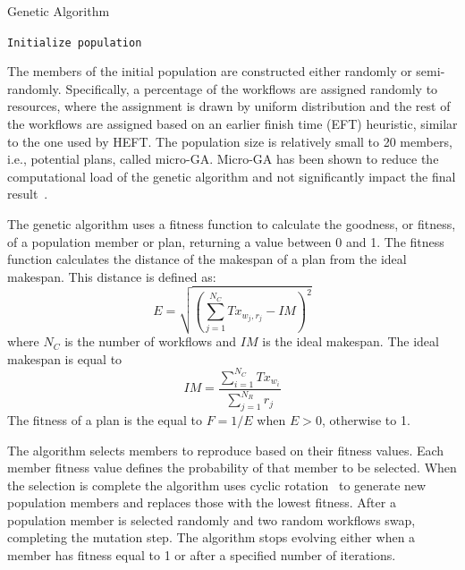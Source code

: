 \begin{algorithm}[t]
    \caption{Genetic Algorithm}
    \label{alg:gen_algo}
    \scriptsize
    \begin{algorithmic}[1]
        \State \texttt{Initialize population}
        \EndWhile
        \EndProcedure
    \end{algorithmic}
\end{algorithm}

The members of the initial population are constructed either randomly or 
semi-randomly. Specifically, a percentage of the workflows are assigned 
randomly to resources, where the assignment is drawn by uniform distribution 
and the rest of the workflows are assigned based on an earlier finish time 
(EFT) heuristic, similar to the one used by HEFT. The population size is 
relatively small to 20 members, i.e., potential plans, called micro-GA.
Micro-GA has been shown to reduce the computational load of the genetic 
algorithm and not significantly impact the final 
result~\cite{zomaya2001observations}.

The genetic algorithm uses a fitness function to calculate the goodness, or 
fitness, of a population member or plan, returning a value between 0 and 1. 
The fitness function calculates the distance of the makespan of a plan from 
the ideal makespan. This distance is defined as:
\begin{equation}
E = \sqrt{(\sum_{j=1}^{N_{C}}Tx_{w_{j},r_{j}} - IM)^2}
\label{eq:fitness}
\end{equation}
where $N_{C}$ is the number of workflows and $IM$ is the ideal makespan. The 
ideal makespan is equal to
\begin{equation}
IM = \frac{\sum_{i=1}^{N_{C}}Tx_{w_{i}}}{\sum_{j=1}^{N_{R}}r_{j}}
\label{eq:ideal_fitness}
\end{equation}
The fitness of a plan is the equal to $F = 1 /E$ when $E > 0$, otherwise to 1.

The algorithm selects members to reproduce based on their fitness values. Each 
member fitness value defines the probability of that member to be selected.
When the selection is complete the algorithm uses cyclic 
rotation~\cite{oliver1987study} to generate new population members and 
replaces those with the lowest fitness. After a population member is selected 
randomly and two random workflows swap, completing the mutation step. The 
algorithm stops evolving either when a member has fitness equal to 1 or after 
a specified number of iterations.

